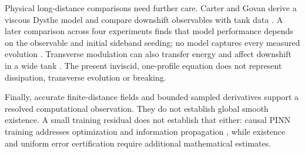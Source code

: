 Physical long-distance comparisons need further care. Carter and Govan
derive a viscous Dysthe model and compare downshift observables with tank
data \cite{viscous}. A later comparison across four experiments finds that
model performance depends on the observable and initial sideband seeding;
no model captures every measured evolution \cite{experiments}.
Transverse modulation can also transfer energy and affect downshift in a
wide tank \cite{transverse}. The present inviscid, one-profile equation
does not represent dissipation, transverse evolution or breaking.

Finally, accurate finite-distance fields and bounded sampled derivatives
support a resolved computational observation. They do not establish global
smooth existence. A small training residual does not establish that either:
causal PINN training addresses optimization and information propagation
\cite{causal}, while existence and uniform error certification require
additional mathematical estimates.
